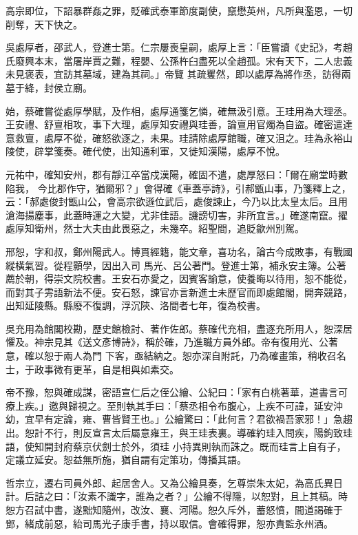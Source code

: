 \begin{pinyinscope}
 高宗即位，下詔暴群姦之罪，貶確武泰軍節度副使，竄懋英州，凡所與濫恩，一切削奪，天下快之。



 吳處厚者，邵武人，登進士第。仁宗屢喪皇嗣，處厚上言：「臣嘗讀《史記》，考趙氏廢興本末，當屠岸賈之難，程嬰、公孫杵臼盡死以全趙孤。宋有天下，二人忠義未見褒表，宜訪其墓域，建為其祠。」帝覽
 其疏矍然，即以處厚為將作丞，訪得兩墓于絳，封侯立廟。



 始，蔡確嘗從處厚學賦，及作相，處厚通箋乞憐，確無汲引意。王珪用為大理丞。王安禮、舒亶相攻，事下大理，處厚知安禮與珪善，論亶用官燭為自盜。確密遣達意救亶，處厚不從，確怒欲逐之，未果。珪請除處厚館職，確又沮之。珪為永裕山陵使，辟掌箋奏。確代使，出知通利軍，又徙知漢陽，處厚不悅。



 元祐中，確知安州，郡有靜江卒當戍漢陽，確固不遣，處厚怒曰：「爾在廟堂時數陷我，
 今比郡作守，猶爾邪？」會得確《車蓋亭詩》，引郝甑山事，乃箋釋上之，云：「郝處俊封甑山公，會高宗欲遜位武后，處俊諫止，今乃以比太皇太后。且用滄海揚塵事，此蓋時運之大變，尤非佳語。譏謗切害，非所宜言。」確遂南竄。擢處厚知衛州，然士大夫由此畏惡之，未幾卒。紹聖間，追貶歙州別駕。



 邢恕，字和叔，鄭州陽武人。博貫經籍，能文章，喜功名，論古今成敗事，有戰國縱橫氣習。從程顥學，因出入司
 馬光、呂公著門。登進士第，補永安主簿。公著薦於朝，得崇文院校書。王安石亦愛之，因賓客諭意，使養晦以待用，恕不能從，而對其子雱語新法不便。安石怒，諫官亦言新進士未歷官而即處館閣，開奔競路，出知延陵縣。縣廢不復調，浮沉陝、洛間者七年，復為校書。



 吳充用為館閣校勘，歷史館檢討、著作佐郎。蔡確代充相，盡逐充所用人，恕深居懼及。神宗見其《送文彥博詩》，稱於確，乃進職方員外郎。帝有復用光、公著意，確以恕于兩人為門
 下客，亟結納之。恕亦深自附託，乃為確畫策，稍收召名士，于政事微有更革，自是相與如素交。



 帝不豫，恕與確成謀，密語宣仁后之侄公繪、公紀曰：「家有白桃著華，道書言可療上疾。」邀與歸視之。至則執其手曰：「蔡丞相令布腹心，上疾不可諱，延安沖幼，宜早有定論，雍、曹皆賢王也。」公繪驚曰：「此何言？君欲禍吾家邪！」急趨出。恕計不行，則反宣言太后屬意雍王，與王珪表裏。導確約珪入問疾，陽鉤致珪語，使知開封府蔡京伏劍士於外，須珪
 小持異則執而誅之。既而珪言上自有子，定議立延安。恕益無所施，猶自謂有定策功，傳播其語。



 哲宗立，遷右司員外郎、起居舍人。又為公繪具奏，乞尊崇朱太妃，為高氏異日計。后詰之曰：「汝素不識字，誰為之者？」公繪不得隱，以恕對，且上其稿。時恕方召試中書，遂黜知隨州，改汝、襄、河陽。恕久斥外，蓄怒憤，間道謁確于鄧，緒成前惡，紿司馬光子康手書，持以取信。會確得罪，恕亦責監永州酒。




\end{pinyinscope}
